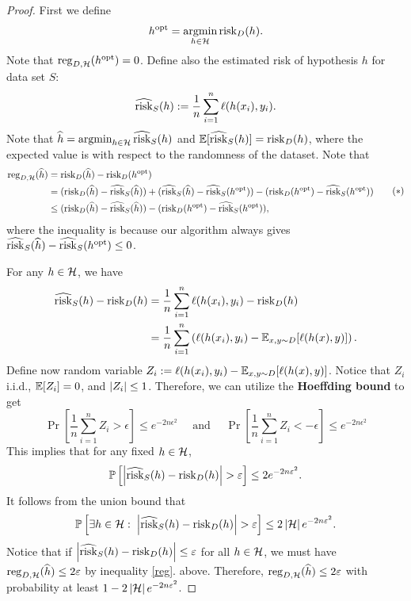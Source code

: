 \documentclass[a4paper]{article}
\begin{document}
\begin{proof}
{
  \newcommand{\hopt}{h^{\text{opt}}}
  First we define
  \[
    \hopt = \argmin_{h \in \hcal} \risk_D (h).
  \]
  Note that $\reg_{D, \hcal}(\hopt) = 0$. Define also the
  estimated risk of hypothesis $h$ for data set $S$:
  \[
  \widehat{\operatorname{risk}}_S (h) := \frac{1}{n} \sum_{i=1}^n \ell(h(x_i),
  y_i).
  \]
  Note that $\widehat{h} = \operatorname*{argmin}_{h \in \mathcal{H}}
  \widehat{\operatorname{risk}}_S (h)$ and $\mathbb{E}[\widehat{\operatorname{risk}}_S (h)] =
  \operatorname{risk}_D(h)$, where the expected value is with respect to
  the randomness of the dataset. Note that
  \begin{equation*}
    \begin{aligned}
      \reg_{D, \hcal} (\hat{h})
      &= \risk_D (\hat{h}) - \risk_D (\hopt) \\
      &= (\risk_D (\hat{h}) - \hat{\risk}_S (\hat{h}))
      + (\hat{\risk}_S (\hat{h}) - \hat{\risk}_S (\hopt))
      - (\risk_D (\hopt) - \hat{\risk}_S (\hopt))  \\
      &\leq (\risk_D (\hat{h}) - \hat{\risk}_S (\hat{h}))
      - (\risk_D (\hopt) - \hat{\risk}_S (\hopt)),
    \end{aligned}
    \tag{$*$}
    \label{reg}
  \end{equation*}
  where the inequality is because our algorithm
  always gives
  $\hat{\risk}_S (\hat{h}) - \hat{\risk}_S (\hopt) \leq 0$.

  For any $h \in \mathcal{H}$, we have
  \[
  \begin{aligned}
    \widehat{\operatorname{risk}}_S (h) - \operatorname{risk}_D(h)
    &= \frac{1}{n} \sum_{i=1}^n \ell(h(x_i), y_i)
    - \operatorname{risk}_D (h) \\
    &= \frac{1}{n} \sum_{i=1}^n \left(
      \ell(h(x_i), y_i) - \mathbb{E}_{x, y \sim D}
      [\ell(h(x), y)]
     \right).
  \end{aligned}
  \]
  Define now random variable $Z_i := \ell(h(x_i), y_i) -
  \mathbb{E}_{x, y \sim D} [\ell(h(x), y)]$. Notice that $Z_i$
  i.i.d., $\mathbb{E}[Z_i] = 0$, and $\left\lvert Z_i\right\rvert \leq 1$. Therefore,
  we can utilize the \textbf{Hoeffding bound} to get
  \[
  \Pr \left[ \frac{1}{n} \sum_{i=1}^n Z_i > \epsilon \right]
  \leq e^{- 2 n \epsilon^2} 
  \quad \text{ and } \quad
  \Pr \left[ \frac{1}{n} \sum_{i=1}^n Z_i < -\epsilon \right]
  \leq e^{- 2 n \epsilon^2}
  \]
  This implies that for any fixed $h \in \mathcal{H}$,
  \[
  \mathbb{P} \left[ \left\lvert \widehat{\operatorname{risk}}_S(h) - \operatorname{risk}_D(h)\right\rvert > \varepsilon
  \right] \leq 2 e^{-2 n \varepsilon^2}.
  \]
  It follows from the union bound that
  \[
  \mathbb{P} \left[ \exists h \in \mathcal{H}: \;
  \left\lvert \widehat{\operatorname{risk}}_S(h) - \operatorname{risk}_D(h)\right\rvert > \varepsilon \right]
  \leq 2 \left\lvert \mathcal{H}\right\rvert e^{- 2 n \varepsilon^2}.
  \]
  Notice that if
  $\left\lvert \widehat{\operatorname{risk}}_S (h) - \operatorname{risk}_D (h)\right\rvert \leq \varepsilon$
  for all $h \in \mathcal{H}$, we must have $\operatorname{reg}_{D, \mathcal{H}}
  (\widehat{h}) \leq 2 \varepsilon$ by inequality \eqref{reg}.
  above. Therefore,
  $\operatorname{reg}_{D, \mathcal{H}} (\widehat{h}) \leq 2 \varepsilon$ with probability at least
  $1 - 2 \left\lvert \mathcal{H}\right\rvert e^{- 2 n \varepsilon^2}$.
}
\end{proof}
\end{document}
